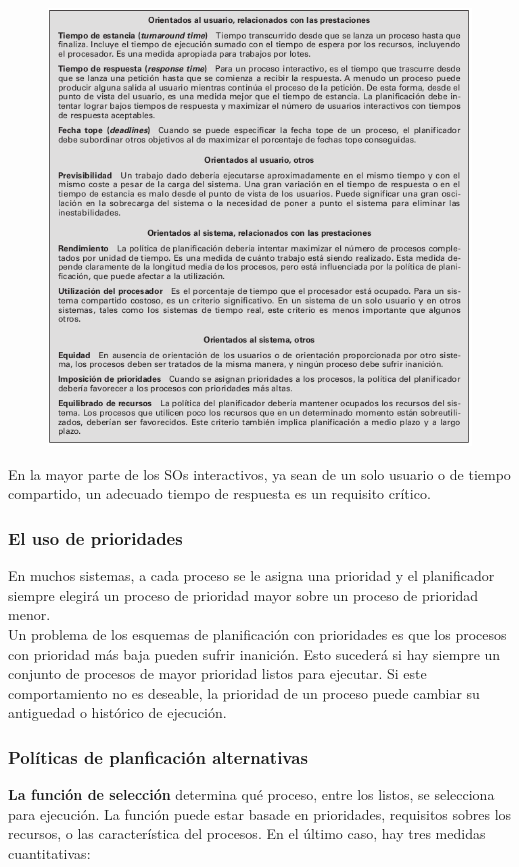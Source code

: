 \documentclass{article}
\begin{document}
				\begin{figure}
				\centering
				\includegraphics[width=1.2\textwidth, scale=1]{tema_2_figura22.png}
				\end{figure}
				
				En la mayor parte de los SOs interactivos, ya sean de un solo usuario o de tiempo compartido, un adecuado tiempo de respuesta es un requisito crítico.
				
			\subsubsection{El uso de prioridades}
				En muchos sistemas, a cada proceso se le asigna una prioridad y el planificador siempre elegirá un proceso de prioridad mayor sobre un proceso de prioridad menor.  \\
				
				Un problema de los esquemas de planificación con prioridades es que los procesos con prioridad más baja pueden sufrir inanición. Esto sucederá si hay siempre un conjunto de procesos de mayor prioridad listos para ejecutar. Si este comportamiento no es deseable, la prioridad de un proceso puede cambiar su antiguedad o histórico de ejecución.
				
			\subsubsection{Políticas de planficación alternativas}
				\textbf{La función de selección} determina qué proceso, entre los listos, se selecciona para ejecución. La función puede estar basade en prioridades, requisitos sobres los recursos, o las característica del procesos. En el último caso, hay tres medidas cuantitativas: \\
			
\end{document}
